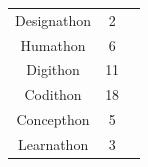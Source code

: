 \begin{center}
	\begin{tabular}{ |c|c|c| } 
		\hline
		Designathon & 2  \\ 
		Humathon & 6 \\ 
		Digithon & 11 \\ 
		Codithon & 18 \\
		Concepthon & 5 \\ 
		Learnathon & 3\\ 
		\hline
	\end{tabular}
\end{center}

